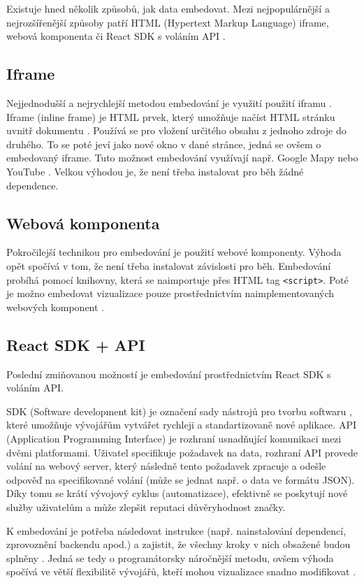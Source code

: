 \documentclass[czech, bc, kiv, he, iso690numb]{fasthesis}
\begin{document}
Existuje hned několik způsobů, jak data embedovat. Mezi nejpopulárnější a nejrozšířenější způsoby patří HTML (Hypertext Markup Language) iframe, webová komponenta či React SDK s voláním API \cite{goodDataEmbedded}. 

\subsection{Iframe}
Nejjednodušší a nejrychlejší metodou embedování je využití použití iframu \cite{goodDataEmbedded}. Iframe (inline frame) je HTML prvek, který umožňuje načíst HTML stránku uvnitř dokumentu \cite{iFrameAdv}. Používá se pro vložení určitého obsahu z jednoho zdroje do druhého. To se poté jeví jako nové okno v dané stránce, jedná se ovšem o embedovaný iframe. Tuto možnost embedování využívají např. Google Mapy nebo YouTube \cite{iFrameAdv}. Velkou výhodou je, že není třeba instalovat pro běh žádné dependence.

\subsection{Webová komponenta}
Pokročilejší technikou pro embedování je použití webové komponenty. Výhoda opět spočívá v tom, že není třeba instalovat závislosti pro běh. Embedování probíhá pomocí knihovny, která se naimportuje přes HTML tag \texttt{<script>}. Poté je možno embedovat vizualizace pouze prostřednictvím naimplementovaných webových komponent \cite{webComp}.

\subsection{React SDK + API}
Poslední zmiňovanou možností je embedování prostřednictvím React SDK s voláním API. 

SDK (Software development kit) je označení sady nástrojů pro tvorbu softwaru \cite{SDKvsAPI}, které umožňuje vývojářům vytvářet rychleji a standartizovaně nové aplikace. API 
(Application Programming Interface) je rozhraní usnadňující komunikaci mezi dvěmi platformami. Uživatel specifikuje požadavek na data, rozhraní API provede volání na webový server, který
následně tento požadavek zpracuje a odešle odpověď na specifikované volání (může se jednat např. o data ve formátu JSON). Díky tomu se krátí vývojový cyklus (automatizace), efektivně 
se poskytují nové služby uživatelům a může zlepšit reputaci důvěryhodnost značky.

K embedování je potřeba následovat instrukce (např. nainstalování dependencí, zprovoznění backendu apod.) a zajistit, že všechny kroky v nich obsažené budou splněny \cite{reactSDKComp}. Jedná se tedy o programátorsky náročnější metodu, ovšem výhoda spočívá ve větší flexibilitě vývojářů, kteří mohou vizualizace snadno modifikovat \cite{goodDataEmbedded}.
\end{document}

